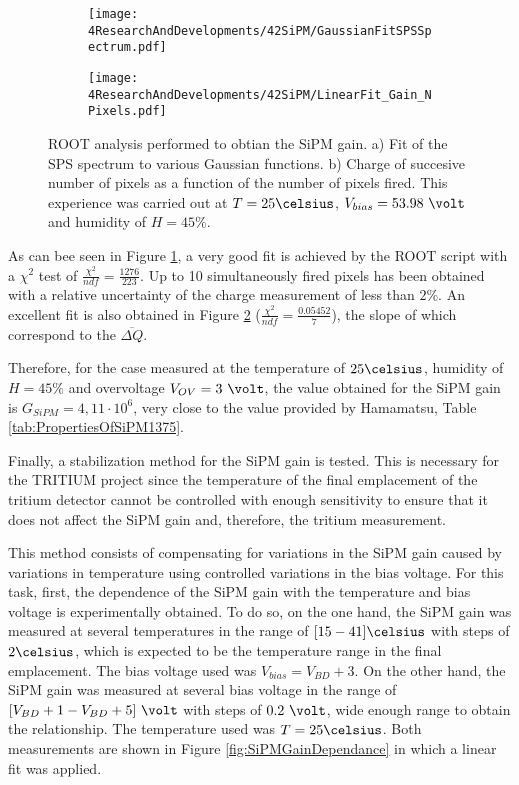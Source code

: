 \begin{figure}
\centering
    \begin{subfigure}[b]{0.47\textwidth}
    \centering
    \texttt{[image: 4ResearchAndDevelopments/42SiPM/GaussianFitSPSSpectrum.pdf]}  
    \caption{\label{subfig:GaussianFitSiPMs}}
    \end{subfigure}
    \hfill
    \begin{subfigure}[b]{0.47\textwidth}
    \centering
    \texttt{[image: 4ResearchAndDevelopments/42SiPM/LinearFit\_Gain\_NPixels.pdf]}  
    \caption{\label{subfig:LinearFitSiPMGain}}
    \end{subfigure}
 \caption{ROOT analysis performed to obtian the SiPM gain. a) Fit of the SPS spectrum to various Gaussian functions. b) Charge of succesive number of pixels as a function of the number of pixels fired. This experience was carried out at $T=25\celsius$, $V_{bias}=53.98~\volt$ and humidity of $H=45\%$.}
 \label{fig:ROOTAnalysisSiPMGain}
\end{figure}

As can bee seen in Figure \ref{subfig:GaussianFitSiPMs}, a very good fit is achieved by the ROOT script with a $\chi^2$ test of $\frac{\chi^2}{ndf}=\frac{1276}{223}$. Up to 10 simultaneously fired pixels has been obtained with a relative uncertainty of the charge measurement of less than $2\%$. An excellent fit is also obtained in Figure \ref{subfig:LinearFitSiPMGain} ($\frac{\chi^2}{ndf}=\frac{0.05452}{7}$), the slope of which correspond to the $\overline{\Delta Q}$.

Therefore, for the case measured at the temperature of $25\celsius$, humidity of $H=45\%$ and overvoltage $V_{OV}=3~\volt$, the value obtained for the SiPM gain is $G_{SiPM}=4,11\cdot{} 10^{6}$, very close to the value provided by Hamamatsu, Table \ref{tab:PropertiesOfSiPM1375}.

Finally, a stabilization method for the SiPM gain is tested. This is necessary for the TRITIUM project since the temperature of the final emplacement of the tritium detector cannot be controlled with enough sensitivity to ensure that it does not affect the SiPM gain and, therefore, the tritium measurement. 

This method consists of compensating for variations in the SiPM gain caused by variations in temperature using controlled variations in the bias voltage. For this task, first, the dependence of the SiPM gain with the temperature and bias voltage is experimentally obtained. To do so, on the one hand, the SiPM gain was measured at several temperatures in the range of $[15-41]\celsius$ with steps of $2\celsius$, which is expected to be the temperature range in the final emplacement. The bias voltage used was $V_{bias} = V_{BD}+3$. On the other hand, the SiPM gain was measured at several bias voltage in the range of $[V_{BD}+1-V_{BD}+5]~\volt$ with steps of $0.2~\volt$, wide enough range to obtain the relationship. The temperature used was $T=25\celsius$. Both measurements are shown in Figure \ref{fig:SiPMGainDependance} in which a linear fit was applied. 

